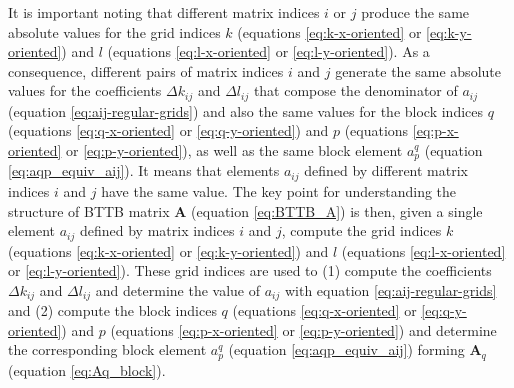It is important noting that different matrix indices $i$ or $j$ produce the same 
absolute values for the grid indices $k$ (equations \ref{eq:k-x-oriented} or 
\ref{eq:k-y-oriented}) and $l$ (equations \ref{eq:l-x-oriented} or 
\ref{eq:l-y-oriented}). As a consequence, different pairs of matrix indices $i$
and $j$ generate the same absolute values for the coefficients $\Delta k_{ij}$ and
$\Delta l_{ij}$ that compose the denominator of $a_{ij}$ 
(equation \ref{eq:aij-regular-grids}) and also the same values for the block indices
$q$ (equations \ref{eq:q-x-oriented} or \ref{eq:q-y-oriented}) and 
$p$ (equations \ref{eq:p-x-oriented} or \ref{eq:p-y-oriented}), as well as the same
block element $a^{q}_{p}$ (equation \ref{eq:aqp_equiv_aij}). 
It means that elements $a_{ij}$ defined
by different matrix indices $i$ and $j$ have the same value. The key point for
understanding the structure of BTTB matrix $\mathbf{A}$ (equation \ref{eq:BTTB_A})
is then, given a single element $a_{ij}$
defined by matrix indices $i$ and $j$, compute the grid indices 
$k$ (equations \ref{eq:k-x-oriented} or \ref{eq:k-y-oriented}) and
$l$ (equations \ref{eq:l-x-oriented} or \ref{eq:l-y-oriented}).
These grid indices are used to 
(1) compute the coefficients $\Delta k_{ij}$ and 
$\Delta l_{ij}$ and determine the value of $a_{ij}$ with equation 
\ref{eq:aij-regular-grids} and 
(2) compute the block indices $q$ (equations \ref{eq:q-x-oriented} 
or \ref{eq:q-y-oriented}) and $p$ (equations \ref{eq:p-x-oriented} or 
\ref{eq:p-y-oriented}) and determine the corresponding block element $a^{q}_{p}$ 
(equation \ref{eq:aqp_equiv_aij}) forming $\mathbf{A}_{q}$ (equation \ref{eq:Aq_block}). 

